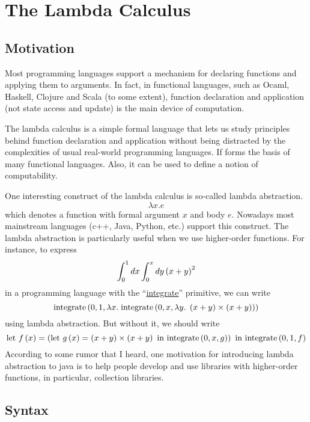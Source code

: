 \chapter{The Lambda Calculus}

\section{Motivation}

\begin{enumcirc}
	\item
	Most programming languages support a mechanism for declaring functions and
	applying them to arguments.
	In fact, in functional languages, such as Ocaml, Haskell, Clojure and Scala (to
	some extent),
	function declaration and application (not state access and update) is the main
	device of computation.
	\item
	The lambda calculus is a simple formal language that lets us study principles
	behind function declaration and application without being distracted by the
	complexities of usual real-world programming languages.
	If forms the basis of many functional languages.
	Also, it can be used to define a notion of computability.
	\item
	One interesting construct of the lambda calculus is so-called lambda
	abstraction.
	\[
		\lambda x. e
	\]
	which denotes a function with formal argument $x$ and body $e$.
	Nowadays most mainstream languages (c++, Java, Python, etc.) support this
	construct.
	The lambda abstraction is particularly useful when we use higher-order
	functions.
	For instance, to express
	\[
		\int_{0}^{1} dx \int_{0}^{x} dy \left( x+y \right)^2
	\]
	in a programming language with the ``\ul{integrate}'' primitive, we can write
	\[
		\textrm{integrate}
		\left( 
			0,
			1,
			\lambda x.\;
			\textrm{integrate}
			\left( 0, x, \lambda y.\; \left( x+y \right) \times \left( x+y \right) \right)
		 \right)
	\]
	using lambda abstraction.
	But without it, we should write
	\[
		\textrm{let }
		f\left( x \right) =
		\left( 
			\textrm{let }
			g\left( x \right) = \left( x+y \right) \times \left( x+y \right) \textrm{ in }
			\textrm{integrate}\left( 0, x, g \right)
		 \right) \textrm{ in }
		\textrm{integrate}\left( 0, 1, f \right)
	\]
	According to some rumor that I heard, one motivation for introducing lambda
	abstraction to java is to help people develop and use libraries with
	higher-order functions, in particular, collection libraries.
\end{enumcirc}

\section{Syntax}

